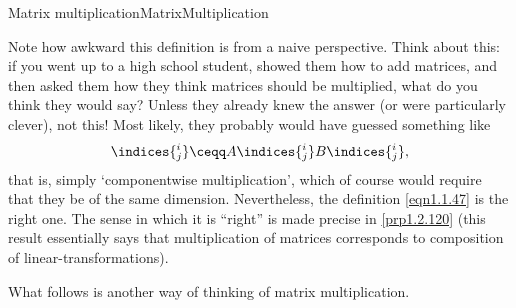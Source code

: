 \begin{dfn}{Matrix multiplication}{MatrixMultiplication}
\begin{rmk}
		Note how awkward this definition is from a naive perspective.  Think about this:  if you went up to a high school student, showed them how to add matrices, and then asked them how they think matrices should be multiplied, what do you think they would say?  Unless they already knew the answer (or were particularly clever), not this!  Most likely, they probably would have guessed something like
		\begin{equation}
		[AB]\indices{^i_j}\ceqq A\indices{^i_j}B\indices{^i_j},
		\end{equation}
		that is, simply `componentwise multiplication', which of course would require that they be of the same dimension.  Nevertheless, the definition \eqref{eqn1.1.47} is the right one.  The sense in which it is ``right'' is made precise in \cref{prp1.2.120} (this result essentially says that multiplication of matrices corresponds to composition of linear-transformations).
	\end{rmk}
\end{dfn}
What follows is another way of thinking of matrix multiplication.
